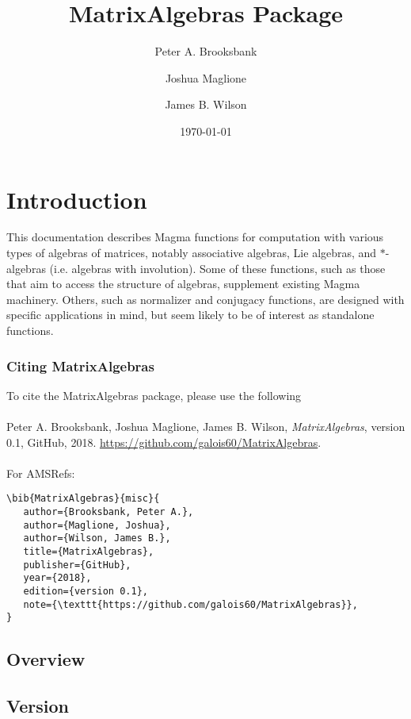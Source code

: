 \documentclass{documentation}
\title{MatrixAlgebras Package}
\author{Peter A. Brooksbank}
\author{Joshua Maglione}
\author{James B. Wilson}
\date{\today}
\begin{document}
\frontmatter

\dominitoc
\maketitle
\tableofcontents

\mainmatter

\chapter{Introduction}

This documentation describes Magma functions for computation with various types of algebras of matrices,
 notably associative algebras, Lie algebras, and $*$-algebras (i.e. algebras with involution). Some of these
 functions, such as those that aim to access the structure of algebras, supplement existing Magma machinery. 
 Others, such as normalizer and conjugacy functions, are designed with specific applications in mind, but
 seem likely to be of interest as standalone functions.

\subsection*{Citing MatrixAlgebras} 
To cite the MatrixAlgebras package, please use the following\\
\\
Peter A. Brooksbank, Joshua Maglione, James B. Wilson, \emph{MatrixAlgebras}, version 0.1, GitHub, 2018. \url{https://github.com/galois60/MatrixAlgebras}. \\
\\
For AMSRefs:
\begin{verbatim}
\bib{MatrixAlgebras}{misc}{
   author={Brooksbank, Peter A.},
   author={Maglione, Joshua},
   author={Wilson, James B.},
   title={MatrixAlgebras},
   publisher={GitHub},
   year={2018},
   edition={version 0.1},
   note={\texttt{https://github.com/galois60/MatrixAlgebras}},
}
\end{verbatim}

\section{Overview}

\section{Version}
\end{document}
